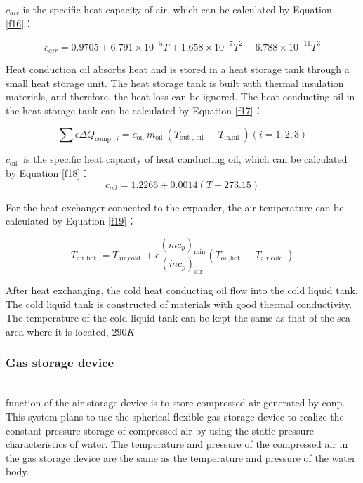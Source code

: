 \documentclass[journal,onecolumn]{IEEEtran}
\begin{document}
$ c_{a i r} $ is the specific heat capacity of air, which can be calculated by Equation \ref{f16}：

\begin{equation}\label{f16}
	c_{a i r}=0.9705+6.791 \times 10^{-5} T+1.658 \times 10^{-7} T^{2}-6.788 \times 10^{-11} T^{3}
\end{equation}

Heat conduction oil absorbs heat and is stored in a heat storage tank through a small heat storage unit. The heat storage tank is built with thermal insulation materials, and therefore, the heat loss can be ignored. The heat-conducting oil in the heat storage tank can be calculated by Equation \ref{f17}：

\begin{equation}\label{f17}
	\sum \epsilon \Delta Q_{\text {comp },i}=c_{\text {oil }} m_{\text {oil }}\left(T_{\text {out }, \text { oil }}-T_{\text {in,oil }}\right)(i=1,2,3)
\end{equation}

$ c_{\text {oil }} $ is the specific heat capacity of heat conducting oil, which can be calculated by Equation \ref{f18}：
\begin{equation}\label{f18}
	c_{o i l}=1.2266+0.0014(T-273.15)
\end{equation}

For the heat exchanger connected to the expander, the air temperature can be calculated by Equation \ref{f19}：

\begin{equation}\label{f19}
	T_{\text {air,hot }}=T_{\text {air,cold }}+\epsilon \frac{\left(\dot{m} c_{p}\right)_{\min }}{\left(\dot{m} c_{p}\right)_{\text {air }}}\left(T_{\text {oil,hot }}-T_{\text {air,cold }}\right)
\end{equation}

After heat exchanging, the cold heat conducting oil flow into the cold liquid tank. The cold liquid tank is constructed of materials with good thermal conductivity. The temperature of the cold liquid tank can be kept the same as that of the sea area where it is located, $ 290K $\ \\


\subsubsection{Gas storage device}
\ \\

 function of the air storage device is to store compressed air generated by conp. This system plans to use the spherical flexible gas storage device to realize the constant pressure storage of compressed air by using the static pressure characteristics of water. The temperature and pressure of the compressed air in the gas storage device are the same as the temperature and pressure of the water body.\\
\end{document}
